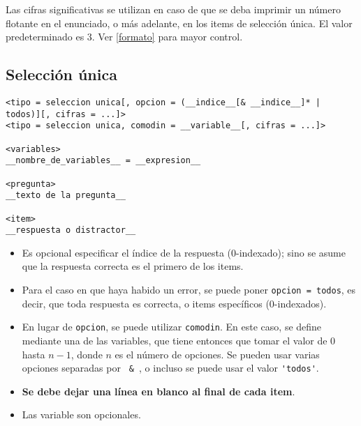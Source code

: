 \documentclass[12pt]{article}
\theoremstyle{definition}
\begin{document}
Las cifras significativas se utilizan en caso de que se deba imprimir un número flotante en el enunciado, o más adelante, en los items de selección única. El valor predeterminado es 3. Ver \ref{formato} para mayor control.

\subsection{Selección única}

\small
\begin{verbatim}
<tipo = seleccion unica[, opcion = (__indice__[& __indice__]* | todos)][, cifras = ...]>
<tipo = seleccion unica, comodin = __variable__[, cifras = ...]>

<variables>
__nombre_de_variables__ = __expresion__

<pregunta>
__texto de la pregunta__

<item>
__respuesta o distractor__

\end{verbatim}
\normalsize

\begin{itemize}
  \item Es opcional especificar el índice de la respuesta (0-indexado); sino se asume que la respuesta correcta es el primero de los items.
  \item Para el caso en que haya habido un error, se puede poner \verb|opcion = todos|, es decir, que toda respuesta es correcta, o items específicos (0-indexados).
  \item En lugar de \verb|opcion|, se puede utilizar \verb|comodin|. En este caso, se define mediante una de las variables, que tiene entonces que tomar el valor de 0 hasta $n-1$, donde $n$ es el n\'umero de opciones. Se pueden usar varias opciones separadas por \verb| & |, o incluso se puede usar el valor \verb|'todos'|.
  \item \textbf{Se debe dejar una línea en blanco al final de cada item}.
  \item Las variable son opcionales.
\end{itemize}


\end{document}
